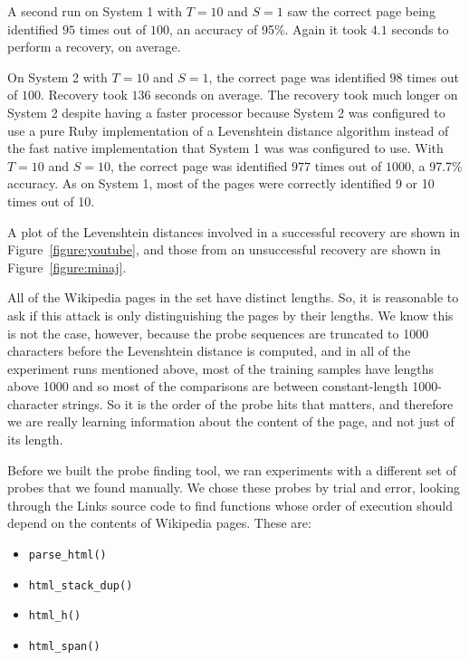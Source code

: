 \documentclass[letterpaper,twocolumn,10pt]{article}
\begin{document}
A second run on System 1 with $T=10$ and $S=1$ saw the
correct page being identified $95$ times out of $100$, an accuracy of 95\%.
Again it took $4.1$ seconds to perform a recovery, on average.

On System 2 with $T=10$ and $S=1$, the correct page was
identified $98$ times out of $100$. Recovery took $136$ seconds on average. The
recovery took much longer on System 2 despite having a faster processor because
System 2 was configured to use a pure Ruby implementation of a Levenshtein
distance algorithm instead of the fast native implementation that System 1 was
was configured to use. With $T=10$ and $S=10$, the correct
page was identified $977$ times out of $1000$, a 97.7\% accuracy. As on System
1, most of the pages were correctly identified 9 or 10 times out of 10.

A plot of the Levenshtein distances involved in a successful recovery are shown
in Figure~\ref{figure:youtube}, and those from an unsuccessful recovery are
shown in Figure~\ref{figure:minaj}.

All of the Wikipedia pages in the set have distinct lengths. So, it is
reasonable to ask if this attack is only distinguishing the pages by their
lengths. We know this is not the case, however, because the probe sequences are
truncated to 1000 characters before the Levenshtein distance is computed, and in
all of the experiment runs mentioned above, most of the training samples have
lengths above 1000 and so most of the comparisons are between constant-length
1000-character strings. So it is the order of the probe hits that matters, and
therefore we are really learning information about the content of the page, and
not just of its length.

Before we built the probe finding tool, we ran experiments with a different set
of probes that we found manually. We chose these probes by trial and error,
looking through the Links source code to find functions whose order of execution
should depend on the contents of Wikipedia pages. These are:

\begin{itemize}
    \item \texttt{parse\_html()}
    \item \texttt{html\_stack\_dup()}
    \item \texttt{html\_h()}
    \item \texttt{html\_span()}
\end{itemize}
\end{document}
